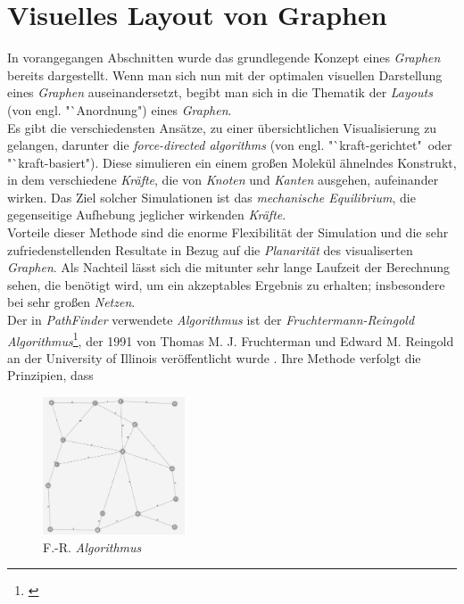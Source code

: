 \documentclass[12pt]{article}
\begin{document}
\section{Visuelles Layout von Graphen}
\label{sec:layout}
In vorangegangen Abschnitten wurde das grundlegende Konzept eines \textit{Graphen} bereits dargestellt. Wenn man sich nun mit der optimalen visuellen Darstellung eines \textit{Graphen} auseinandersetzt, begibt man sich in die Thematik der \textit{Layouts} (von engl. "`Anordnung") eines \textit{Graphen}.
\\ 
Es gibt die verschiedensten Ansätze, zu einer übersichtlichen Visualisierung zu gelangen, darunter die \textit{force-directed algorithms} (von engl. "`kraft-gerichtet"\ oder "`kraft-basiert")\cite{force-directed}. Diese simulieren ein einem großen Molekül ähnelndes Konstrukt, in dem verschiedene \textit{Kräfte}, die von \textit{Knoten} und \textit{Kanten} ausgehen, aufeinander wirken. Das Ziel solcher Simulationen ist das \textit{mechanische Equilibrium}, die gegenseitige Aufhebung jeglicher wirkenden \textit{Kräfte}.\\
Vorteile dieser Methode sind die enorme Flexibilität der Simulation und die sehr zufriedenstellenden Resultate in Bezug auf die \textit{Planarität} des visualiserten \textit{Graphen}. Als Nachteil lässt sich die mitunter sehr lange Laufzeit der Berechnung sehen, die benötigt wird, um ein akzeptables Ergebnis zu erhalten; insbesondere bei sehr großen \textit{Netzen}.
\\
Der in \textit{PathFinder} verwendete \textit{Algorithmus} ist der \textit{Fruchtermann-Reingold Algorithmus}\footnote{\cite[Kapitel 12.3, S. 386f]{force-directed2}}, der 1991 von Thomas M. J. Fruchterman und Edward M. Reingold an der University of Illinois veröffentlicht wurde \cite{fruchterman}. Ihre Methode verfolgt die Prinzipien, dass
\begin{figure}
\vspace{-20pt}
\begin{center}
\includegraphics[width=0.375\textwidth]{res/graph_2.png}
\end{center}
\vspace{-30pt}
\centering
\caption{F.-R. \textit{Algorithmus}}
\label{fig:graph_2}
\end{figure}
\end{document}
